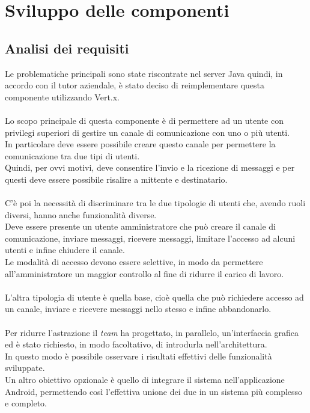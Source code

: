   \section{Sviluppo delle componenti}
    \subsection{Analisi dei requisiti}
      Le problematiche principali sono state riscontrate nel server Java quindi, in accordo con il tutor aziendale, è stato deciso di reimplementare questa componente utilizzando Vert.x.\\\\
      Lo scopo principale di questa componente è di permettere ad un utente con privilegi superiori di gestire un canale di comunicazione con uno o più utenti.\\
      In particolare deve essere possibile creare questo canale per permettere la comunicazione tra due tipi di utenti.\\
      Quindi, per ovvi motivi, deve consentire l'invio e la ricezione di messaggi e per questi deve essere possibile risalire a mittente e destinatario.\\\\
      C'è poi la necessità di discriminare tra le due tipologie di utenti che, avendo ruoli diversi, hanno anche funzionalità diverse.\\
      Deve essere presente un utente amministratore che può creare il canale di comunicazione, inviare messaggi, ricevere messaggi, limitare l'accesso ad alcuni utenti e infine chiudere il canale.\\
      Le modalità di accesso devono essere selettive, in modo da permettere all'amministratore un maggior controllo al fine di ridurre il carico di lavoro.\\\\
      L'altra tipologia di utente è quella base, cioè quella che può richiedere accesso ad un canale, inviare e ricevere messaggi nello stesso e infine abbandonarlo.\\\\
      Per ridurre l'astrazione il \textit{team} ha progettato, in parallelo, un'interfaccia grafica ed è stato richiesto, in modo facoltativo, di introdurla nell'architettura.\\
      In questo modo è possibile osservare i risultati effettivi delle funzionalità sviluppate.\\
      Un altro obiettivo opzionale è quello di integrare il sistema nell'applicazione Android, permettendo così l'effettiva unione dei due in un sistema più complesso e completo.\\
